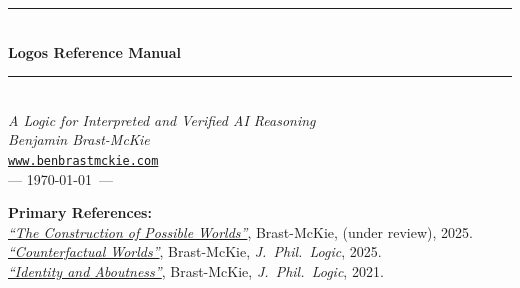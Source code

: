 \documentclass[11pt]{article}
\theoremstyle{definition}
\theoremstyle{plain}
\theoremstyle{remark}
\newcommand{\HRule}{\rule{\linewidth}{0.5mm}}
\begin{document}
\begin{titlepage}
	\begin{center}

		\vspace*{2cm}

		\HRule\\[0.4cm]
		{\Huge \bfseries Logos Reference Manual}\\[0.2cm]
		\HRule\\[1cm]

		{\LARGE\itshape A Logic for Interpreted and Verified AI Reasoning}\\[1cm]


		{\large\itshape Benjamin Brast-McKie}\\[0.15cm]
		\texttt{\href{https://www.benbrastmckie.com}{www.benbrastmckie.com}}\\[0.15cm]
		{--- \today\ ---}\\[1cm]

		\vfill

		{\normalsize\bfseries Primary References:}\\[0.3cm]
		\href{https://www.benbrastmckie.com/wp-content/uploads/2025/11/possible_worlds.pdf}{\textit{``The Construction of Possible Worlds''}}, Brast-McKie, (under review), 2025.\\[.2cm]
		\href{https://link.springer.com/article/10.1007/s10992-025-09793-8}{\textit{``Counterfactual Worlds''}}, Brast-McKie, \textit{J.~Phil.~Logic}, 2025.\\[0.2cm]
		\href{https://link.springer.com/article/10.1007/s10992-021-09612-w}{\textit{``Identity and Aboutness''}}, Brast-McKie, \textit{J.~Phil.~Logic}, 2021.\\[1cm]

	\end{center}
\end{titlepage}
\thispagestyle{empty}

{

	\begin{abstract}
		\noindent
		This reference manual provides the formal specification of the Logos which is an extensible formal language of thought designed to train AI systems in verified logical reasoning.
		The Logos is interpreted by a hyperintensional task semantics designed to support operators for reasoning with tense, modal, counterfactual conditional, constitutive explanatory, causal, and many other types of expressive resources.
		The semantics and proof theory for the foundational layers of the Logos are then successively extended by a plugin system to support a wide range of additional operators for complex reasoning to plan and evaluate actions in multi-agent systems under conditions of uncertainty.
	\end{abstract}

	\pagestyle{empty}
	\tableofcontents
	\cleardoublepage
}
\end{document}
